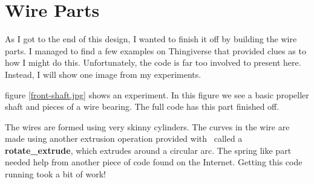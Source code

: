 \section{Wire Parts}

As I got to the end of this design, I wanted to finish it off by building the
wire parts. I managed to find a few examples on {Thingiverse} that provided
clues as to how I might do this. Unfortunately, the code is far too involved to
present here. Instead, I will show one image from my experiments.


figure \ref{front-shaft.jpg} shows an experiment. In this figure we see a basic
propeller shaft and pieces of a wire bearing. The full code has this part
finished off.

The wires are formed using very skinny cylinders. The curves in the wire are
made using another extrusion operation provided with \osc\ called a {\bf
rotate\_extrude}, which extrudes around a circular arc. The spring like part
needed help from another piece of code found on the Internet. Getting this code
running took a bit of work!
